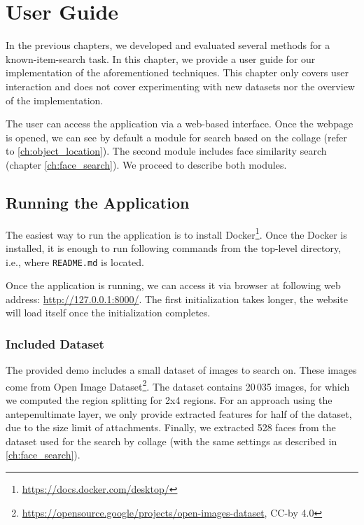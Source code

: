 \chapter{User Guide}
\label{ch:user_guide}

In the previous chapters, we developed and evaluated several methods for a known-item-search task. In this chapter, we provide a user guide for our implementation of the aforementioned techniques. This chapter only covers user interaction and does not cover experimenting with new datasets nor the overview of the implementation.

The user can access the application via a web-based interface. Once the webpage is opened, we can see by default a module for search based on the collage (refer to \ref{ch:object_location}). The second module includes face similarity search (chapter \ref{ch:face_search}). We proceed to describe both modules.

\section{Running the Application}

The easiest way to run the application is to install Docker\footnote{\url{https://docs.docker.com/desktop/}}. Once the Docker is installed, it is enough to run following commands from the top-level directory, i.e., where \verb+README.md+ is located.

\vspace{0.5cm}


\vspace{0.5cm}

Once the application is running, we can access it via browser at following web address: \url{http://127.0.0.1:8000/}. The first initialization takes longer, the website will load itself once the initialization completes. 

\subsection*{Included Dataset}

The provided demo includes a small dataset of images to search on. These images come from Open Image Dataset\footnote{\url{https://opensource.google/projects/open-images-dataset}, CC-by 4.0}. The dataset contains 20\,035 images, for which we computed the region splitting for 2x4 regions. For an approach using the antepenultimate layer, we only provide extracted features for half of the dataset, due to the size limit of attachments. Finally, we extracted 528 faces from the dataset used for the search by collage (with the same settings as described in \autoref{ch:face_search}).

